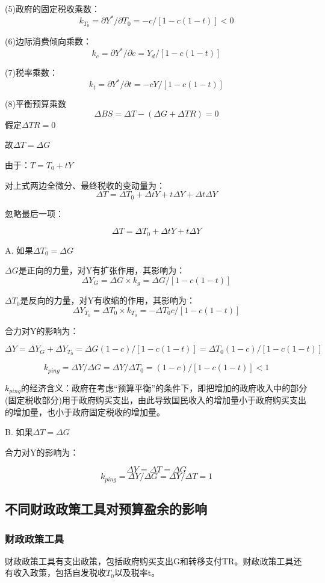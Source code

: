 \documentclass{article}
\begin{document}
(5)政府的固定税收乘数：
\[ k_{T_0}=\partial Y^*/\partial T_0=-c/[1-c(1-t)]<0 \]

(6)边际消费倾向乘数：
\[ k_c=\partial Y^*/\partial c=Y_d/[1-c(1-t)] \]

(7)税率乘数：
\[ k_t=\partial Y^*/\partial t=-cY/[1-c(1-t)] \]

(8)平衡预算乘数
\[
\Delta BS=\Delta T-(\Delta G+\Delta TR)=0
\]
假定$ \Delta TR=0 $

故$ \Delta T=\Delta G $

由于：$ T=T_0+tY $

对上式两边全微分、最终税收的变动量为：
\[
\Delta T=\Delta T_0+\Delta tY+t\Delta Y+\Delta t\Delta Y
\]

忽略最后一项：

\[
\Delta T=\Delta T_0+\Delta tY+t\Delta Y
\]

A. 如果$ \Delta T_0=\Delta G $

$ \Delta G $是正向的力量，对Y有扩张作用，其影响为：
\[
\Delta Y_G=\Delta G\times k_g=\Delta G/[1-c(1-t)]
\]

$ \Delta T_0 $是反向的力量，对Y有收缩的作用，其影响为：
\[
\Delta Y_{T_0}=\Delta T_0\times k_{T_0}=-\Delta T_0c/[1-c(1-t)]
\]

合力对Y的影响为：

\[
\Delta Y=\Delta Y_G+\Delta Y_{T_0}=\Delta G(1-c)/[1-c(1-t)]=\Delta T_0(1-c)/[1-c(1-t)]
\]

\[
k_{ping}=\Delta Y/\Delta G=\Delta Y/\Delta T_0=(1-c)/[1-c(1-t)]<1
\]

$ k_{ping} $的经济含义：政府在考虑“预算平衡”的条件下，即把增加的政府收入中的部分(固定税收部分)用于政府购买支出，由此导致国民收入的增加量小于政府购买支出的增加量，也小于政府固定税收的增加量。

\hspace*{\fill}

B. 如果$ \Delta T=\Delta G $

合力对Y的影响为：

\[
\Delta Y=\Delta T=\Delta G
\]
\[
k_{ping}=\Delta Y/\Delta G=\Delta Y/\Delta T=1
\]

\subsection{不同财政政策工具对预算盈余的影响}
\subsubsection{财政政策工具}
财政政策工具有支出政策，包括政府购买支出G和转移支付TR。财政政策工具还有收入政策，包括自发税收$ T_0 $以及税率t。
\end{document}
